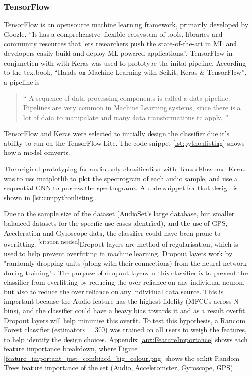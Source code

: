 \documentclass{UoNMCHA}
\newcommand{\citationneeded}{\textsuperscript{\color{blue} [citation needed]}}
\newcommand{\inlineQuote}[1]{``#1''}
\newcommand{\fancyquote}[1]{\begin{quotation}\inlineQuote{#1}\end{quotation}}
\newcommand{\fref}[1] {Figure \ref{#1}}
\numberwithin{equation}{section}
\begin{document}
\subsubsection{TensorFlow}
TensorFlow is an opensource machine learning framework, primarily developed by Google.
\inlineQuote{It has a comprehensive, flexible ecosystem of tools, libraries and community resources that lets researchers push the state-of-the-art in ML and developers easily build and deploy ML powered applications.}\cite{TFwebsite}. TensorFlow in conjunction with with Keras was used to prototype the inital pipeline. According to the textbook, \inlineQuote{Hands on Machine Learning with Scikit, Keras \& TensorFlow}, a pipeline is 
\fancyquote{
A sequence of data processing components is called a data pipeline. Pipelines are very common in Machine Learning systems, since there is a lot of data to manipulate and many data transformations to apply\cite{HandsOnMLTextbook}.
}

TensorFlow and Keras were selected to initially design the classifier due it's ability to run on the TensorFlow Lite. The code snippet \ref{lst:pythonlisting} shows how a model converts.



The original prototyping for audio only classification with TensorFlow and Keras was to use matplotlib to plot the spectrogram of each audio sample, and use a sequential CNN to process the spectrograms. A code snippet for that design is shown in \ref{lst:cnnpythonlisting}.

Due to the sample size of the dataset (AudioSet's large database, but smaller balanced datasets for the specific use-cases identified), and the use of GPS, Acceleration and Gyroscope data, the classifier could have been prone to overfitting. \citationneeded Dropout layers are method of regularisation, which is used to help prevent overfitting in machine learning. Dropout layers work by "randomly dropping units (along with their connections) from the neural network during training" \cite{witten2016data}. The purpose of dropout layers in this classifier is to prevent the classifier from overfitting by reducing the over reliance on any individual neuron, but also to reduce the over reliance on any individual data source. This is important because the Audio feature has the highest fidelity (MFCCs across N-bins), and the classifier could have a heavy bias towards it and as a result overfit. Dropout layers will help minimise this overfit. To test this hypothesis, a Random Forest classifier (estimators = 300) was trained on all users to weigh the features, to help identify the design choices. Appendix \ref{apx:FeatureImportance} shows each feature importance breakdown, where \fref{feature_important_just_combined_big_colour.png} shows the scikit Random Trees feature importance of the set (Audio, Accelerometer, Gyroscope, GPS).
\end{document}
